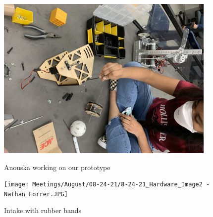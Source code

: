 \begin{figure}[ht]
\centering
\begin{minipage}[b]{.48\textwidth}
  \centering
  \includegraphics[width=0.95\textwidth]{Meetings/August/08-24-21/8-24-21_Hardware_Image1 - Nathan Forrer.JPG}
  \caption{Anouska working on our prototype}
  \label{fig:082421_3}
\end{minipage}%
\hfill%
\begin{minipage}[b]{.48\textwidth}
  \centering
  \texttt{[image: Meetings/August/08-24-21/8-24-21\_Hardware\_Image2 - Nathan Forrer.JPG]}
  \caption{Intake with rubber bands}
  \label{fig:082421_4}
\end{minipage}
\end{figure}


